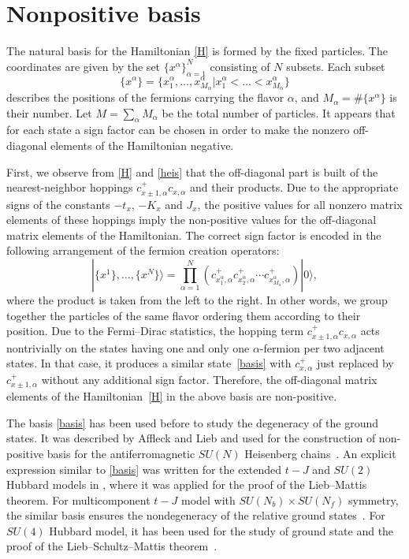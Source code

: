 \section{Nonpositive basis}\label{section3}

The natural basis for the Hamiltonian \eqref{H} is formed by the f\/ixed particles. The coordinates
are given by the set $\{x^\alpha\}_{\alpha=1}^N$ consisting of $N$  subsets. Each subset
\[
\{x^\alpha\}=\{x^\alpha_1,\dots,x^\alpha_{M_\alpha} | x^\alpha_1<\dots <x^\alpha_{M_\alpha}\}
\]
describes the positions of the fermions carrying the f\/lavor $\alpha$, and $M_\alpha=\#\{x^\alpha\}$
is their number. Let  $M=\sum_\alpha M_\alpha$
be the total number of particles.
It appears that for each state a sign factor can be
chosen in order to make the nonzero of\/f-diagonal elements of the Hamiltonian
negative.

First, we observe from \eqref{H} and \eqref{heis} that the of\/f-diagonal part is built of
the nearest-neighbor hoppings $c^+_{x\pm1,\alpha}c_{x,\alpha}$ and their products.
Due to the appropriate signs of the
constants $-t_x$, $-K_x$ and $J_x$,
the positive values for all nonzero  matrix elements of these hoppings
imply  the non-positive values for the of\/f-diagonal matrix elements of the Hamiltonian.
The correct sign factor is encoded in the following arrangement of the fermion creation operators:
\begin{equation}
\label{basis}
|\{x^1\},\dots,\{x^N\}\rangle =
\prod_{\alpha=1}^N (c^+_{x^\alpha_1,\alpha}c^+_{x^\alpha_2,\alpha}\cdots c^+_{x^\alpha_{M_\alpha},\alpha}) |0\rangle,
\end{equation}
where the product is taken from the left to the right. In other words, we group together the particles
of the same f\/lavor ordering them according to their position.
Due to the Fermi--Dirac statistics, the hopping term  $c^+_{x\pm1,\alpha}c_{x,\alpha}$ acts
nontrivially on the states having one and only one $\alpha$-fermion per two adjacent states.
In that case, it produces a similar state~\eqref{basis} with $c^+_{x,\alpha}$ just replaced by $c^+_{x\pm1,\alpha}$
without any additional sign factor.
Therefore, the of\/f-diagonal matrix elements of the  Hamiltonian~\eqref{H} in the above basis are non-positive.

The basis \eqref{basis} has been used before to study the degeneracy of the ground states.
It was described by Af\/f\/leck and Lieb and used for the
construction of  non-positive basis for the antiferromagnetic $SU(N)$ Heisenberg chains~\cite{AL86}.
An  explicit expression similar to \eqref{basis} was written
for the extended $t-J$ and $SU(2)$ Hubbard models in \cite{Amb92-1,Amb92-2}, where it
was applied for the proof of the Lieb--Mattis theorem.
For multicomponent $t-J$ model with $SU(N_b)\times SU(N_f)$
symmetry, the similar basis ensures the nondegeneracy of the relative ground states~\cite{sorella96}.
For $SU(4)$ Hubbard model, it has been used for the study
of ground state and the proof of the Lieb--Schultz--Mattis theorem~\cite{LTML04}.

